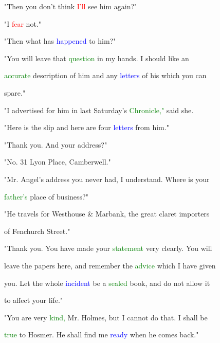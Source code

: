  "Then you don't think \textcolor{red}{I'll} see him again?"



 "I \textcolor{red}{fear} not."



 "Then what has \textcolor{blue}{happened} to him?"



 "You will \textcolor{BurntOrange}{leave} that \textcolor{green}{question} in my hands. I should like an

 \textcolor{green}{accurate} description of him and any \textcolor{blue}{letters} of his which you can

 spare."



 "I advertised for him in last Saturday's \textcolor{green}{Chronicle,"} said she.

 "Here is the \textcolor{BurntOrange}{slip} and here are four \textcolor{blue}{letters} from him."



 "Thank you. And your address?"



 "No. 31 Lyon Place, Camberwell."



 "Mr. \textcolor{BurntOrange}{Angel's} address you never had, I understand. Where is your

 \textcolor{green}{father's} place of business?"



 "He travels for Westhouse & Marbank, the great claret importers

 of Fenchurch Street."



 "Thank you. You have made your \textcolor{green}{statement} very clearly. You will

 \textcolor{BurntOrange}{leave} the papers here, and remember the \textcolor{green}{advice} which I have given

 you. Let the whole \textcolor{blue}{incident} be a \textcolor{green}{sealed} book, and do not allow it

 to affect your life."



 "You are very \textcolor{green}{kind,} Mr. Holmes, but I cannot do that. I shall be

 \textcolor{green}{true} to Hosmer. He shall find me \textcolor{blue}{ready} when he comes back."




